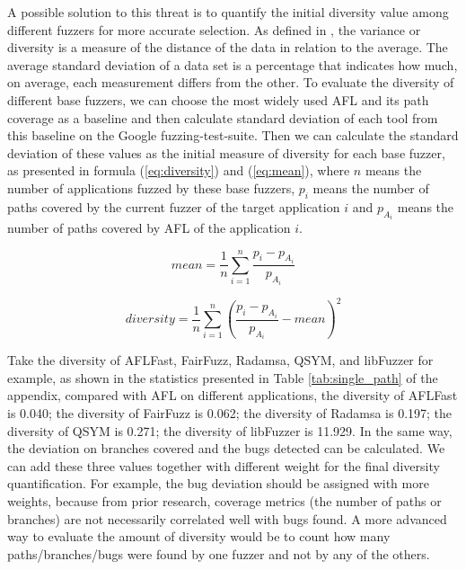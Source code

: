 A possible solution to this threat is to quantify the initial diversity value among different fuzzers for more accurate selection. 
As defined in \cite{benjamin2014probability}, the variance or diversity is a measure of the distance of the data in relation to the average. The average standard deviation of a data set is a percentage that indicates how much, on average, each measurement differs from the other. 
To evaluate the diversity of different base fuzzers, we can choose the most widely used AFL and its path coverage as a baseline and then calculate standard deviation of each tool from this baseline on the Google fuzzing-test-suite. Then we can calculate the standard deviation of these values as the initial measure of diversity for each base fuzzer, as presented in formula (\ref{eq:diversity}) and (\ref{eq:mean}),  
where \(n\) means the number of applications fuzzed by these base fuzzers, \(p_i\) means the number of paths covered by the current fuzzer of the target application \(i\) and \(p_{A_i}\) means the number of paths covered by AFL of the application \(i\).

\begin{equation}\label{eq:mean}
mean = \frac{1}{n} \sum_{i=1}^{n}{ \frac{p_i - p_{A_i}}{p_{A_i}} }
\end{equation}

\begin{equation}\label{eq:diversity}
diversity = \frac{1}{n} \sum_{i=1}^{n}{ {( \frac{p_i - p_{A_i}}{p_{A_i}} - mean )} ^{ 2 }  }
\end{equation}

Take the diversity of AFLFast, FairFuzz, Radamsa, QSYM, and libFuzzer for example, as shown in the statistics presented in Table \ref{tab:single_path} of the appendix, compared with AFL on different applications, 
the diversity of AFLFast is 0.040; 
the diversity of FairFuzz is 0.062; 
the diversity of Radamsa is 0.197; 
the diversity of QSYM is 0.271; 
the diversity of libFuzzer is 11.929. 
In the same way, the deviation on branches covered and the bugs detected can be calculated. We can add these three values together with different weight for the final diversity quantification. For example, the bug deviation should be assigned with more weights, because from prior research, coverage metrics (the number of paths or branches) are not necessarily correlated well with bugs found.  A more advanced way to evaluate the amount of diversity would be to count how many paths/branches/bugs were found by one fuzzer and not by any of the others. 


